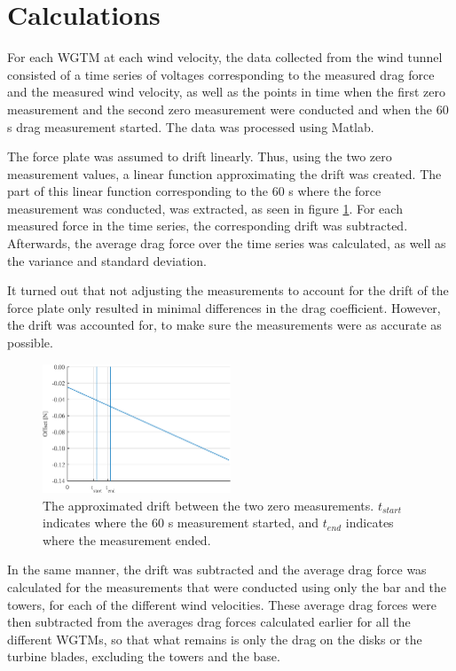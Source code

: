 \section{Calculations}

For each \gls{WGTM} at each wind velocity, the data collected from the wind tunnel consisted of a time series of voltages corresponding to the measured drag force and the measured wind velocity, as well as the points in time when the first zero measurement and the second zero measurement were conducted and when the 60 \si{\s} drag measurement started. The data was processed using Matlab. 

The force plate was assumed to drift linearly. Thus, using the two zero measurement values, a linear function approximating the drift was created. The part of this linear function corresponding to the 60 \si{\s} where the force measurement was conducted, was extracted, as seen in figure \ref{Fig:driftAdjust}. For each measured force in the time series, the corresponding drift was subtracted. Afterwards, the average drag force over the time series was calculated, as well as the variance and standard deviation. 

It turned out that not adjusting the measurements to account for the drift of the force plate only resulted in minimal differences in the drag coefficient. However, the drift was accounted for, to make sure the measurements were as accurate as possible. 

\begin{figure}
    \centering
    \includegraphics[width=0.5\textwidth]{0_Images/DriftDown.eps}    
    \caption[The approximated drift of the force plate.]{The approximated drift between the two zero measurements. $t_{start}$ indicates where the 60 \si{s} measurement started, and $t_{end}$ indicates where the measurement ended.}
    \label{Fig:driftAdjust}
\end{figure}

In the same manner, the drift was subtracted and the average drag force was calculated for the measurements that were conducted using only the bar and the towers, for each of the different wind velocities. These average drag forces were then subtracted from the averages drag forces calculated earlier for all the different \gls{WGTM}s, so that what remains is only the drag on the disks or the turbine blades, excluding the towers and the base. 

